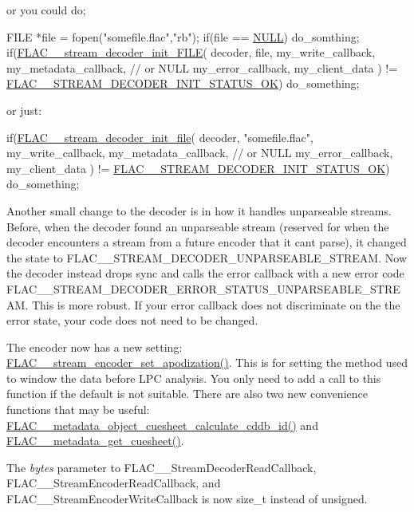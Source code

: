 or you could do;


\begin{DoxyCode}
[...]
FILE *file = fopen(\textcolor{stringliteral}{"somefile.flac"},\textcolor{stringliteral}{"rb"});
\textcolor{keywordflow}{if}(file == \hyperlink{getopt1_8c_a070d2ce7b6bb7e5c05602aa8c308d0c4}{NULL}) do\_somthing;
\textcolor{keywordflow}{if}(\hyperlink{group__flac__stream__decoder_ga38f9eb46bf112af205f86b4cbac9980c}{FLAC\_\_stream\_decoder\_init\_FILE}(
  decoder,
  file,
  my\_write\_callback,
  my\_metadata\_callback,  \textcolor{comment}{// or NULL}
  my\_error\_callback,
  my\_client\_data
) != \hyperlink{group__flac__stream__decoder_ggaaed54a24ac6310d29c5cafba79759c44ac94c7e9396f30642f34805e5d626e011}{FLAC\_\_STREAM\_DECODER\_INIT\_STATUS\_OK}) do\_something;
\end{DoxyCode}


or just\+:


\begin{DoxyCode}
[...]
\textcolor{keywordflow}{if}(\hyperlink{group__flac__stream__decoder_ga1692108a97012d1c5f79baf7df012c33}{FLAC\_\_stream\_decoder\_init\_file}(
  decoder,
  \textcolor{stringliteral}{"somefile.flac"},
  my\_write\_callback,
  my\_metadata\_callback,  \textcolor{comment}{// or NULL}
  my\_error\_callback,
  my\_client\_data
) != \hyperlink{group__flac__stream__decoder_ggaaed54a24ac6310d29c5cafba79759c44ac94c7e9396f30642f34805e5d626e011}{FLAC\_\_STREAM\_DECODER\_INIT\_STATUS\_OK}) do\_something;
\end{DoxyCode}


Another small change to the decoder is in how it handles unparseable streams. Before, when the decoder found an unparseable stream (reserved for when the decoder encounters a stream from a future encoder that it can\textquotesingle{}t parse), it changed the state to {\ttfamily F\+L\+A\+C\+\_\+\+\_\+\+S\+T\+R\+E\+A\+M\+\_\+\+D\+E\+C\+O\+D\+E\+R\+\_\+\+U\+N\+P\+A\+R\+S\+E\+A\+B\+L\+E\+\_\+\+S\+T\+R\+E\+AM}. Now the decoder instead drops sync and calls the error callback with a new error code {\ttfamily F\+L\+A\+C\+\_\+\+\_\+\+S\+T\+R\+E\+A\+M\+\_\+\+D\+E\+C\+O\+D\+E\+R\+\_\+\+E\+R\+R\+O\+R\+\_\+\+S\+T\+A\+T\+U\+S\+\_\+\+U\+N\+P\+A\+R\+S\+E\+A\+B\+L\+E\+\_\+\+S\+T\+R\+E\+AM}. This is more robust. If your error callback does not discriminate on the the error state, your code does not need to be changed.

The encoder now has a new setting\+: \hyperlink{group__flac__stream__encoder_ga83d38fd6fca7abbf8363bdc2536a299e}{F\+L\+A\+C\+\_\+\+\_\+stream\+\_\+encoder\+\_\+set\+\_\+apodization()}. This is for setting the method used to window the data before L\+PC analysis. You only need to add a call to this function if the default is not suitable. There are also two new convenience functions that may be useful\+: \hyperlink{group__flac__metadata__object_ga897138ca0a985d8741f73d6657f38845}{F\+L\+A\+C\+\_\+\+\_\+metadata\+\_\+object\+\_\+cuesheet\+\_\+calculate\+\_\+cddb\+\_\+id()} and \hyperlink{group__flac__metadata__level0_ga6ee2633dc179c2a0cb5fef5762faf0fd}{F\+L\+A\+C\+\_\+\+\_\+metadata\+\_\+get\+\_\+cuesheet()}.

The {\itshape bytes} parameter to F\+L\+A\+C\+\_\+\+\_\+\+Stream\+Decoder\+Read\+Callback, F\+L\+A\+C\+\_\+\+\_\+\+Stream\+Encoder\+Read\+Callback, and F\+L\+A\+C\+\_\+\+\_\+\+Stream\+Encoder\+Write\+Callback is now {\ttfamily size\+\_\+t} instead of {\ttfamily unsigned}. 